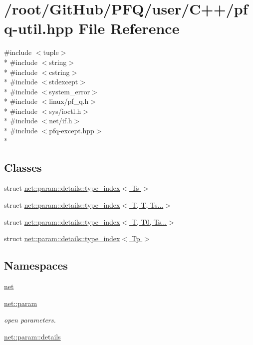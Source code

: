 \hypertarget{pfq-util_8hpp}{\section{/root/\-Git\-Hub/\-P\-F\-Q/user/\-C++/pfq-\/util.hpp File Reference}
\label{pfq-util_8hpp}
}
{\ttfamily \#include $<$tuple$>$}\\*
{\ttfamily \#include $<$string$>$}\\*
{\ttfamily \#include $<$cstring$>$}\\*
{\ttfamily \#include $<$stdexcept$>$}\\*
{\ttfamily \#include $<$system\-\_\-error$>$}\\*
{\ttfamily \#include $<$linux/pf\-\_\-q.\-h$>$}\\*
{\ttfamily \#include $<$sys/ioctl.\-h$>$}\\*
{\ttfamily \#include $<$net/if.\-h$>$}\\*
{\ttfamily \#include $<$pfq-\/except.\-hpp$>$}\\*
\subsection*{Classes}
\begin{DoxyCompactItemize}
\item 
struct \hyperlink{structnet_1_1param_1_1details_1_1type__index}{net\-::param\-::details\-::type\-\_\-index$<$ Ts $>$}
\item 
struct \hyperlink{structnet_1_1param_1_1details_1_1type__index_3_01T_00_01T_00_01Ts_8_8_8_4}{net\-::param\-::details\-::type\-\_\-index$<$ T, T, Ts...$>$}
\item 
struct \hyperlink{structnet_1_1param_1_1details_1_1type__index_3_01T_00_01T0_00_01Ts_8_8_8_4}{net\-::param\-::details\-::type\-\_\-index$<$ T, T0, Ts...$>$}
\item 
struct \hyperlink{structnet_1_1param_1_1details_1_1type__index_3_01Tp_01_4}{net\-::param\-::details\-::type\-\_\-index$<$ Tp $>$}
\end{DoxyCompactItemize}
\subsection*{Namespaces}
\begin{DoxyCompactItemize}
\item 
\hyperlink{namespacenet}{net}
\item 
\hyperlink{namespacenet_1_1param}{net\-::param}
\begin{DoxyCompactList}\small\item\em open parameters. \end{DoxyCompactList}\item 
\hyperlink{namespacenet_1_1param_1_1details}{net\-::param\-::details}
\end{DoxyCompactItemize}
